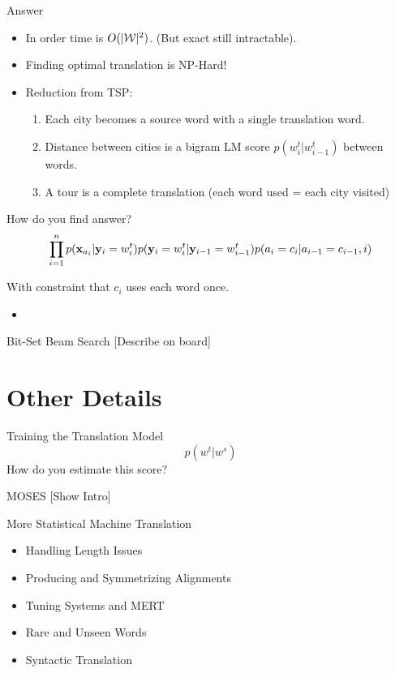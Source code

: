 \documentclass{beamer}
\begin{document}
\begin{frame}{Answer}
  \begin{itemize}
  \item In order time is $O(|\mathcal{W}|^2)$. (But exact still intractable).
    \air  

  \item Finding optimal translation is NP-Hard!
    \air 

  \item Reduction from TSP:
    \begin{enumerate}
    \item Each city becomes a source word with a single translation word.
    \item Distance between cities is a bigram LM score $p(w^t_i | w^t_{i-1})$ between words.
    \item A tour is a complete translation (each word used = each city visited)
    \end{enumerate}
  \end{itemize}
\end{frame}

\begin{frame}{How do you find answer?}
  \[  \prod_{i=1}^n p(\mathbf{x}_{a_i} | \mathbf{y}_i=w^t_i) p(\mathbf{y}_i=w^t_i | \mathbf{y}_{i-1}=w^t_{i-1}) p(a_i = c_i | a_{i-1}=c_{i-1}, i) \] 

  With constraint that $c_i$ uses each word once.  

  \begin{itemize}
  \item 
  \end{itemize}
\end{frame}

\begin{frame}{Bit-Set Beam Search}
  [Describe on board] 
\end{frame}


\section{Other Details}

\begin{frame}{Training the Translation Model}
  \[ p(w^t | w^s) \] 
  How do you estimate this score? 
\end{frame}


\begin{frame}{MOSES}
  [Show Intro]
\end{frame}

\begin{frame}{More Statistical Machine Translation}
  \begin{itemize}
  \item Handling Length Issues
  \item Producing and Symmetrizing Alignments
  \item Tuning Systems and MERT 
  \item Rare and Unseen Words
  \item Syntactic Translation
  \end{itemize}
\end{frame}
\end{document}
